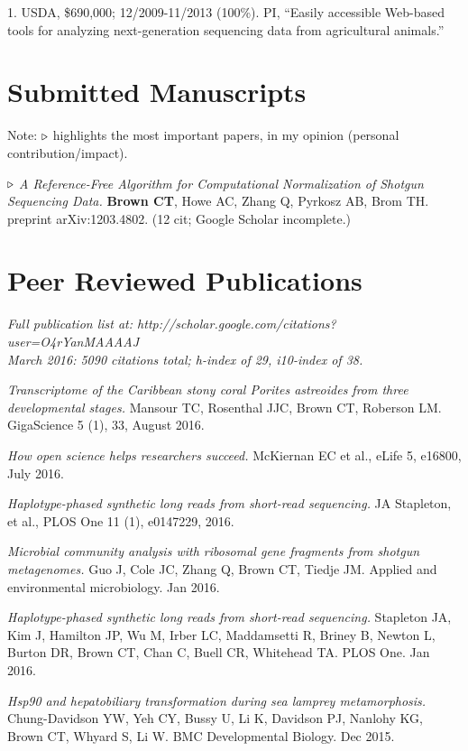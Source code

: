 \documentclass[margin,line]{resume}
\begin{document}
\begin{resume}
1. USDA, \$690,000; 12/2009-11/2013 (100\%).  PI, ``Easily accessible Web-based tools for analyzing next-generation sequencing data from agricultural animals.''


    \section{\mysidestyle Submitted Manuscripts}

Note: {\color{red} ${\bf \triangleright}$} highlights the most important
papers, in my opinion (personal contribution/impact).

{\color{red} ${\bf \triangleright}$}
{\em A Reference-Free Algorithm for Computational Normalization of Shotgun Sequencing Data.} {\bf Brown CT}, Howe AC, Zhang Q, Pyrkosz AB, Brom TH. preprint arXiv:1203.4802. (12 cit; Google Scholar incomplete.)

    \section{\mysidestyle Peer Reviewed Publications}

{\em Full publication list at: http://scholar.google.com/citations?user=O4rYanMAAAAJ\\
  March 2016: 5090 citations total; h-index of 29, i10-index of 38.}

{\em Transcriptome of the Caribbean stony coral Porites astreoides from three developmental stages.} Mansour TC, Rosenthal JJC, Brown CT, Roberson LM.
GigaScience 5 (1), 33, August 2016.

{\em How open science helps researchers succeed.}
McKiernan EC et al., eLife 5, e16800, July 2016.

{\em Haplotype-phased synthetic long reads from short-read sequencing.}
JA Stapleton, et al.,
PLOS One 11 (1), e0147229, 2016.

{\em Microbial community analysis with ribosomal gene fragments from shotgun metagenomes.} Guo J, Cole JC, Zhang Q, Brown CT, Tiedje JM. Applied and environmental microbiology. Jan 2016.

{\em Haplotype-phased synthetic long reads from short-read sequencing.} Stapleton JA, Kim J, Hamilton JP, Wu M, Irber LC, Maddamsetti R, Briney B, Newton L, Burton DR, Brown CT, Chan C, Buell CR, Whitehead TA. PLOS One. Jan 2016.

{\em Hsp90 and hepatobiliary transformation during sea lamprey metamorphosis.}
Chung-Davidson YW, Yeh CY, Bussy U, Li K, Davidson PJ, Nanlohy KG, Brown CT, Whyard S, Li W. BMC Developmental Biology. Dec 2015.


\end{resume}
\end{document}
